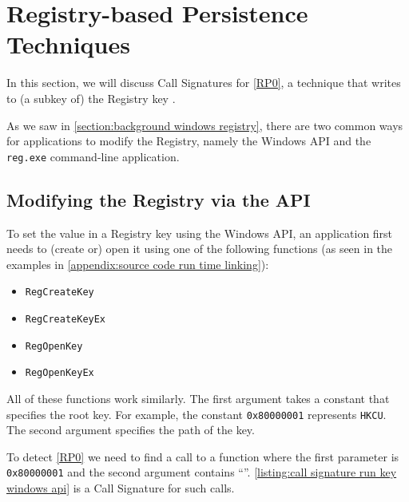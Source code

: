 \section{Registry-based Persistence Techniques}\label{section:call signatures rp}
In this section, we will discuss Call Signatures for \autoref{RP0}, a technique that writes to (a subkey of) the Registry key .

As we saw in \autoref{section:background windows registry}, there are two common ways for applications to modify the Registry, namely the Windows API and the \texttt{reg.exe} command-line application.

\subsection{Modifying the Registry via the API}

To set the value in a Registry key using the Windows API, an application first needs to (create or) open it using one of the following functions (as seen in the examples in \autoref{appendix:source code run time linking}):
\begin{multicols}{2}
  \begin{itemize}
      \item \texttt{RegCreateKey}
      \item \texttt{RegCreateKeyEx}
      \item \texttt{RegOpenKey}
      \item \texttt{RegOpenKeyEx}
  \end{itemize}
\end{multicols}

All of these functions work similarly. The first argument takes a constant that specifies the root key. For example, the constant \texttt{0x80000001} represents \texttt{HKCU}. The second argument specifies the path of the key.

To detect \autoref{RP0} we need to find a call to a function where the first parameter is \texttt{0x80000001} and the second argument contains ``''. \autoref{listing:call signature run key windows api} is a Call Signature for such calls.

